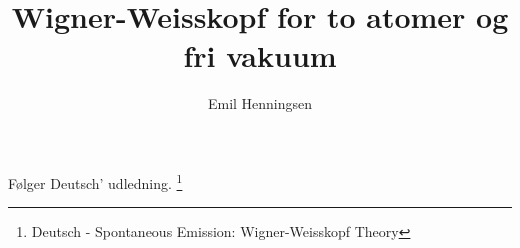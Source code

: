 \documentclass{article}
\begin{document}
\title{Wigner-Weisskopf for to atomer og fri vakuum}
\author{Emil Henningsen}
\maketitle

Følger Deutsch' udledning. \footnote[1]{Deutsch - Spontaneous Emission: Wigner-Weisskopf Theory}
\end{document}
